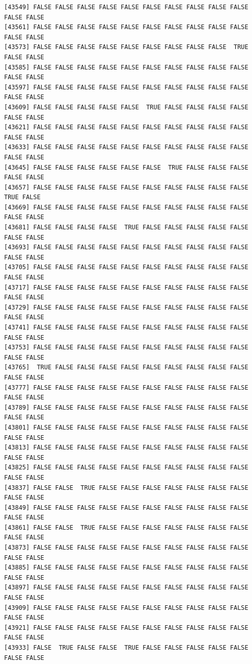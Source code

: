 \documentclass[
  a4paper,
  DIV=11,
  numbers=noendperiod]{scrartcl}
\begin{document}
\begin{verbatim}
[43549] FALSE FALSE FALSE FALSE FALSE FALSE FALSE FALSE FALSE FALSE FALSE FALSE
[43561] FALSE FALSE FALSE FALSE FALSE FALSE FALSE FALSE FALSE FALSE FALSE FALSE
[43573] FALSE FALSE FALSE FALSE FALSE FALSE FALSE FALSE FALSE  TRUE FALSE FALSE
[43585] FALSE FALSE FALSE FALSE FALSE FALSE FALSE FALSE FALSE FALSE FALSE FALSE
[43597] FALSE FALSE FALSE FALSE FALSE FALSE FALSE FALSE FALSE FALSE FALSE FALSE
[43609] FALSE FALSE FALSE FALSE FALSE  TRUE FALSE FALSE FALSE FALSE FALSE FALSE
[43621] FALSE FALSE FALSE FALSE FALSE FALSE FALSE FALSE FALSE FALSE FALSE FALSE
[43633] FALSE FALSE FALSE FALSE FALSE FALSE FALSE FALSE FALSE FALSE FALSE FALSE
[43645] FALSE FALSE FALSE FALSE FALSE FALSE  TRUE FALSE FALSE FALSE FALSE FALSE
[43657] FALSE FALSE FALSE FALSE FALSE FALSE FALSE FALSE FALSE FALSE  TRUE FALSE
[43669] FALSE FALSE FALSE FALSE FALSE FALSE FALSE FALSE FALSE FALSE FALSE FALSE
[43681] FALSE FALSE FALSE FALSE  TRUE FALSE FALSE FALSE FALSE FALSE FALSE FALSE
[43693] FALSE FALSE FALSE FALSE FALSE FALSE FALSE FALSE FALSE FALSE FALSE FALSE
[43705] FALSE FALSE FALSE FALSE FALSE FALSE FALSE FALSE FALSE FALSE FALSE FALSE
[43717] FALSE FALSE FALSE FALSE FALSE FALSE FALSE FALSE FALSE FALSE FALSE FALSE
[43729] FALSE FALSE FALSE FALSE FALSE FALSE FALSE FALSE FALSE FALSE FALSE FALSE
[43741] FALSE FALSE FALSE FALSE FALSE FALSE FALSE FALSE FALSE FALSE FALSE FALSE
[43753] FALSE FALSE FALSE FALSE FALSE FALSE FALSE FALSE FALSE FALSE FALSE FALSE
[43765]  TRUE FALSE FALSE FALSE FALSE FALSE FALSE FALSE FALSE FALSE FALSE FALSE
[43777] FALSE FALSE FALSE FALSE FALSE FALSE FALSE FALSE FALSE FALSE FALSE FALSE
[43789] FALSE FALSE FALSE FALSE FALSE FALSE FALSE FALSE FALSE FALSE FALSE FALSE
[43801] FALSE FALSE FALSE FALSE FALSE FALSE FALSE FALSE FALSE FALSE FALSE FALSE
[43813] FALSE FALSE FALSE FALSE FALSE FALSE FALSE FALSE FALSE FALSE FALSE FALSE
[43825] FALSE FALSE FALSE FALSE FALSE FALSE FALSE FALSE FALSE FALSE FALSE FALSE
[43837] FALSE FALSE  TRUE FALSE FALSE FALSE FALSE FALSE FALSE FALSE FALSE FALSE
[43849] FALSE FALSE FALSE FALSE FALSE FALSE FALSE FALSE FALSE FALSE FALSE FALSE
[43861] FALSE FALSE  TRUE FALSE FALSE FALSE FALSE FALSE FALSE FALSE FALSE FALSE
[43873] FALSE FALSE FALSE FALSE FALSE FALSE FALSE FALSE FALSE FALSE FALSE FALSE
[43885] FALSE FALSE FALSE FALSE FALSE FALSE FALSE FALSE FALSE FALSE FALSE FALSE
[43897] FALSE FALSE FALSE FALSE FALSE FALSE FALSE FALSE FALSE FALSE FALSE FALSE
[43909] FALSE FALSE FALSE FALSE FALSE FALSE FALSE FALSE FALSE FALSE FALSE FALSE
[43921] FALSE FALSE FALSE FALSE FALSE FALSE FALSE FALSE FALSE FALSE FALSE FALSE
[43933] FALSE  TRUE FALSE FALSE  TRUE FALSE FALSE FALSE FALSE FALSE FALSE FALSE

\end{verbatim}
\end{document}
